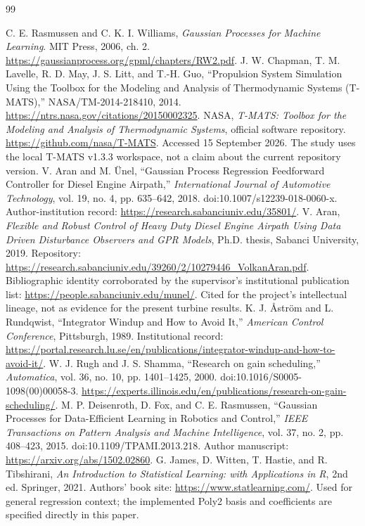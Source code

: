 \begin{thebibliography}{99}
 C. E. Rasmussen and C. K. I. Williams, \emph{Gaussian Processes for Machine Learning}. MIT Press, 2006, ch. 2. \url{https://gaussianprocess.org/gpml/chapters/RW2.pdf}.
 J. W. Chapman, T. M. Lavelle, R. D. May, J. S. Litt, and T.-H. Guo, ``Propulsion System Simulation Using the Toolbox for the Modeling and Analysis of Thermodynamic Systems (T-MATS),'' NASA/TM-2014-218410, 2014. \url{https://ntrs.nasa.gov/citations/20150002325}.
 NASA, \emph{T-MATS: Toolbox for the Modeling and Analysis of Thermodynamic Systems}, official software repository. \url{https://github.com/nasa/T-MATS}. Accessed 15 September 2026. The study uses the local T-MATS v1.3.3 workspace, not a claim about the current repository version.
 V. Aran and M. \"Unel, ``Gaussian Process Regression Feedforward Controller for Diesel Engine Airpath,'' \emph{International Journal of Automotive Technology}, vol. 19, no. 4, pp. 635--642, 2018. doi:10.1007/s12239-018-0060-x. Author-institution record: \url{https://research.sabanciuniv.edu/35801/}.
 V. Aran, \emph{Flexible and Robust Control of Heavy Duty Diesel Engine Airpath Using Data Driven Disturbance Observers and GPR Models}, Ph.D. thesis, Sabanci University, 2019. Repository: \url{https://research.sabanciuniv.edu/39260/2/10279446_VolkanAran.pdf}. Bibliographic identity corroborated by the supervisor's institutional publication list: \url{https://people.sabanciuniv.edu/munel/}. Cited for the project's intellectual lineage, not as evidence for the present turbine results.
 K. J. \AA str\"om and L. Rundqwist, ``Integrator Windup and How to Avoid It,'' \emph{American Control Conference}, Pittsburgh, 1989. Institutional record: \url{https://portal.research.lu.se/en/publications/integrator-windup-and-how-to-avoid-it/}.
 W. J. Rugh and J. S. Shamma, ``Research on gain scheduling,'' \emph{Automatica}, vol. 36, no. 10, pp. 1401--1425, 2000. doi:10.1016/S0005-1098(00)00058-3. \url{https://experts.illinois.edu/en/publications/research-on-gain-scheduling/}.
 M. P. Deisenroth, D. Fox, and C. E. Rasmussen, ``Gaussian Processes for Data-Efficient Learning in Robotics and Control,'' \emph{IEEE Transactions on Pattern Analysis and Machine Intelligence}, vol. 37, no. 2, pp. 408--423, 2015. doi:10.1109/TPAMI.2013.218. Author manuscript: \url{https://arxiv.org/abs/1502.02860}.
 G. James, D. Witten, T. Hastie, and R. Tibshirani, \emph{An Introduction to Statistical Learning: with Applications in R}, 2nd ed. Springer, 2021. Authors' book site: \url{https://www.statlearning.com/}. Used for general regression context; the implemented Poly2 basis and coefficients are specified directly in this paper.


\end{thebibliography}
